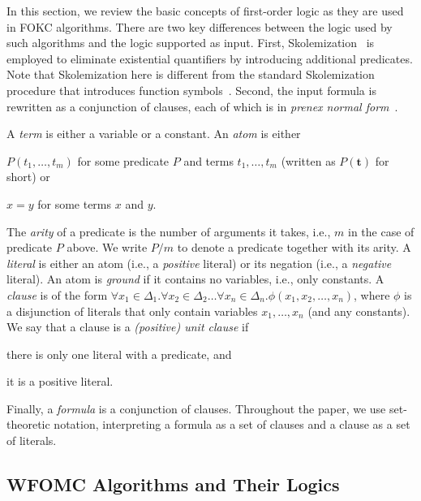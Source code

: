 \documentclass[letterpaper]{article} %
\theoremstyle{remark}
\theoremstyle{definition}
\begin{document}
In this section, we review the basic concepts of first-order logic as they are
used in FOKC algorithms. There are two key differences between the logic used by
such algorithms and the logic supported as input. First,
Skolemization~\cite{DBLP:conf/kr/BroeckMD14} is employed to eliminate
existential quantifiers by introducing additional predicates. Note that
Skolemization here is different from the standard Skolemization procedure that
introduces function symbols~\cite{DBLP:books/daglib/0030198}. Second, the input
formula is rewritten as a conjunction of clauses, each of which is in
\emph{prenex normal form}~\cite{hinman2018fundamentals}.

A \emph{term} is either a variable or a constant. An \emph{atom} is either
\begin{enumerate*}[label=(\roman*)]
  \item $P(t_{1}, \dots, t_{m})$ for some predicate $P$ and terms
  $t_{1}, \dots, t_{m}$ (written as $P(\mathbf{t})$ for short) or
  \item $x=y$ for some terms $x$ and $y$.
\end{enumerate*}
The \emph{arity} of a predicate is the number of arguments it takes, i.e., $m$
in the case of predicate $P$ above. We write $P/m$ to denote a predicate
together with its arity. A \emph{literal} is either an atom (i.e., a
\emph{positive} literal) or its negation (i.e., a \emph{negative} literal). An
atom is \emph{ground} if it contains no variables, i.e., only constants. A
\emph{clause} is of the form
$\forall x_{1} \in \Delta_{1}\text{.}\forall x_{2} \in \Delta_{2}\dots\text{}\forall x_{n} \in \Delta_{n}\text{.}\phi(x_{1}, x_{2}, \dots, x_{n})$,
where $\phi$ is a disjunction of literals that only contain variables
$x_{1}, \dots, x_{n}$ (and any constants). We say that a clause is a
\emph{(positive) unit clause} if
\begin{enumerate*}[label=(\roman*)]
  \item there is only one literal with a predicate, and
  \item it is a positive literal.
\end{enumerate*}
Finally, a \emph{formula} is a conjunction of clauses. Throughout the paper, we
use set-theoretic notation, interpreting a formula as a set of clauses and a
clause as a set of literals.

\subsection{WFOMC Algorithms and Their Logics}\label{sec:threelogics}
\end{document}
